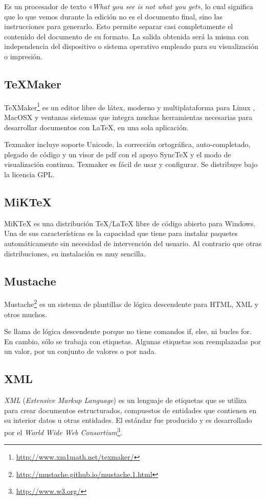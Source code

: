 Es un procesador de texto «\emph{What you see is not what you get}», lo cual significa que lo que vemos durante la edición no es el 
documento final, sino las instrucciones para generarlo.
Esto permite separar casi completamente el contenido del documento de su formato. La salida obtenida será la misma con independencia del dispositivo o sistema operativo empleado para su visualización o impresión.

\subsection{\TeX{}Maker}
\TeX{}Maker\footnote{\url{http://www.xm1math.net/texmaker/}} es un editor libre de látex, moderno y multiplataforma para Linux , MacOSX y ventanas sistemas que integra muchas herramientas necesarias para desarrollar documentos con \LaTeX{}, en una sola aplicación.

Texmaker incluye soporte Unicode, la corrección ortográfica, auto-completado, plegado de código y un visor de pdf con el apoyo SyncTeX y el modo de visualización continua. Texmaker es fácil de usar y configurar. Se distribuye bajo la licencia GPL.

\subsection{MiK\TeX{}}
MiK\TeX{} es una distribución \TeX{}/\LaTeX{} libre de código abierto para Windows.
Una de sus características es la capacidad que tiene para instalar paquetes automáticamente sin necesidad de intervención del usuario. Al contrario que otras distribuciones, su instalación es muy sencilla.

\subsection{Mustache}
Mustache\footnote{\url{http://mustache.github.io/mustache.1.html}} es un sistema de plantillas de lógica descendente para HTML, XML y otros muchos.

Se llama de lógica descendente porque no tiene comandos if, else, ni bucles for. En cambio, sólo se trabaja con etiquetas.
Algunas etiquetas son reemplazadas por un valor, por un conjunto de valores o por nada.
\subsection{XML}
\emph{XML} (\emph{Extensive Markup Language}) es un lenguaje de etiquetas que se utiliza para crear documentos estructurados, compuestos de entidades que contienen en su interior datos u otras entidades.
El estándar fue producido y es desarrollado por el \emph{World Wide Web Consortium}\footnote{\url{http://www.w3.org/}}.

